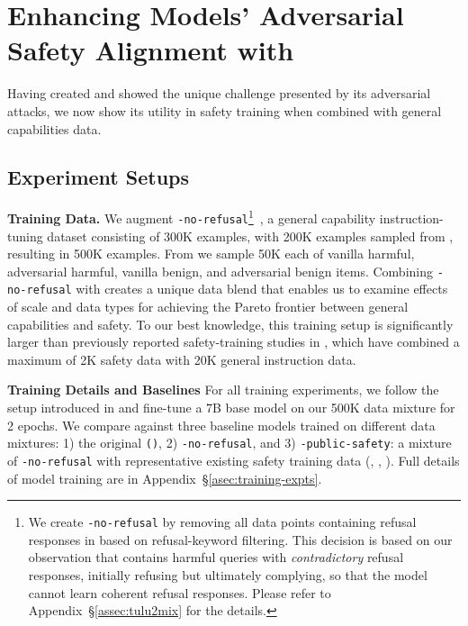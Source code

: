 
\section{Enhancing Models' Adversarial Safety Alignment with \dataset}
\label{sec:safety_training}

Having created \dataset and showed the unique challenge presented by its adversarial attacks, we now show its utility in safety training when combined with general capabilities data.



\subsection{Experiment Setups}

\textbf{Training Data.} We augment \texttt{\tulumix-no-refusal}\footnote{
We create \texttt{\tulumix-no-refusal} by removing all data points containing refusal responses in \texttt{\tulumix} based on refusal-keyword filtering. This decision is based on our observation that \texttt{\tulumix} contains harmful queries with \textit{contradictory} refusal responses, initially refusing but ultimately complying, so that the model cannot learn coherent refusal responses. Please refer to Appendix~\S\ref{assec:tulu2mix} for the details.}~\citep{ivison2023tulu}, a general capability instruction-tuning dataset consisting of 300K examples, with 200K examples sampled from \dataset, resulting in 500K examples. From \dataset we sample 50K each of vanilla harmful, adversarial harmful, vanilla benign, and adversarial benign items. 
Combining \texttt{\tulumix-no-refusal} with \dataset creates a unique data blend that enables us to examine effects of scale and data types for achieving the Pareto frontier between general capabilities and safety. To our best knowledge, this training setup is significantly larger than previously reported safety-training studies in \citet{bianchi2023safety}, which have combined a maximum of 2K safety data with 20K general instruction data. 

\textbf{Training Details and Baselines} For all training experiments, we follow the setup introduced in \tulu \citep{ivison2023tulu} and fine-tune a \llama 7B base model on our 500K data mixture for 2 epochs. We compare against three baseline models trained on different data mixtures: 1) the original \texttt{\tulumix (\tulumixshort)}, 2) \texttt{\tulumixshort-no-refusal}, and 3) \texttt{\tulumixshort-public-safety}: a mixture of \texttt{\tulumixshort-no-refusal} with representative existing safety training data (\ie \hhrlhf\cite{hh-rlhf}, \saferlhf\cite{safe-rlhf}, \danshort\cite{doanytingnow}). Full details of model training are in Appendix~\S\ref{asec:training-expts}.

